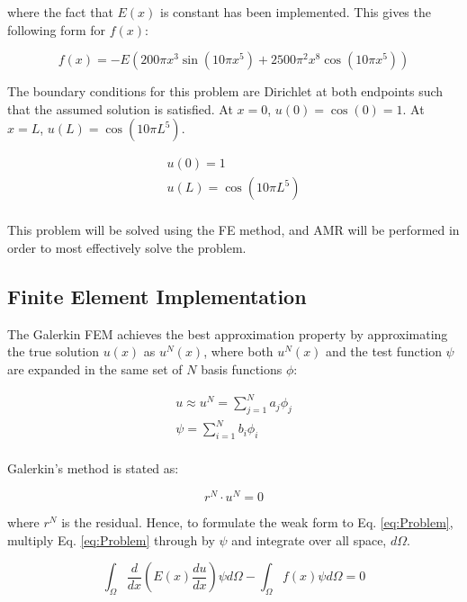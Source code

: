 \documentclass[10pt]{article}
\begin{document}
where the fact that \(E(x)\) is constant has been implemented. This gives the following form for \(f(x)\):

\begin{equation}
\label{eq:Problem3}
f(x)=-E\left(200\pi x^3\sin{(10\pi x^5)}+2500\pi^2x^8\cos{(10\pi x^5)} \right)
\end{equation}

The boundary conditions for this problem are Dirichlet at both endpoints such that the assumed solution is satisfied. At \(x=0\), \(u(0)=\cos{(0)}=1\). At \(x=L\), \(u(L)=\cos{(10\pi L^5)}\). 

\begin{equation}
\begin{aligned}
u(0)=1\\
u(L)=\cos{(10\pi L^5)}\\
\end{aligned}
\end{equation}

This problem will be solved using the FE method, and AMR will be performed in order to most effectively solve the problem.

\subsection{Finite Element Implementation}

The Galerkin FEM achieves the best approximation property by approximating the true solution \(u(x)\) as \(u^N(x)\), where both \(u^N(x)\) and the test function \(\psi\) are expanded in the same set of \(N\) basis functions \(\phi\):

\begin{equation}
\label{eq:approx}
\begin{aligned}
u\approx u^N=\sum_{j=1}^{N}a_j\phi_j\\
\psi=\sum_{i=1}^{N}b_i\phi_i\\
\end{aligned}
\end{equation}

Galerkin's method is stated as:

\begin{equation}
r^N\cdot u^N=0
\end{equation}

where \(r^N\) is the residual. Hence, to formulate the weak form to Eq. \eqref{eq:Problem}, multiply Eq. \eqref{eq:Problem} through by \(\psi\) and integrate over all space, \(d\Omega\).

\begin{equation}
\int_{\Omega}^{}\frac{d}{dx}\left(E(x)\frac{du}{dx}\right)\psi d\Omega-\int_{\Omega}^{}f(x)\psi d\Omega=0
\end{equation}
\end{document}
